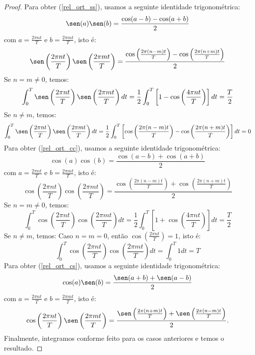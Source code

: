 \begin{proof}
 Para obter (\ref{rel_ort_ss}), usamos a seguinte identidade trigonométrica:
 \begin{equation}\sen(a)\sen(b)=\frac{\cos(a-b)-\cos(a+b)}{2}\end{equation}
com $a=\frac{2\pi nt}{T}$ e $b=\frac{2\pi mt}{T}$, isto é:
 \begin{equation}\sen\left(\frac{2\pi nt}{T}\right)\sen\left(\frac{2\pi mt}{T}\right)=\frac{\cos\left(\frac{2\pi (n-m)t}{T}\right)-\cos\left(\frac{2\pi (n+m)t}{T}\right)}{2}\end{equation}
Se $n=m\neq 0$, temos:
 \begin{equation}\int_0^T\sen\left(\frac{2\pi nt}{T}\right)\sen\left(\frac{2\pi mt}{T}\right)dt=\frac{1}{2}\int_0^T\left[1-\cos\left(\frac{4\pi nt}{T}\right)\right]dt=\frac{T}{2}\end{equation}
 Se $n\neq m$, temos:
 \begin{equation}
   \int_0^T\sen\left(\frac{2\pi nt}{T}\right)\sen\left(\frac{2\pi mt}{T}\right)dt = \frac{1}{2}\int_0^T\left[\cos\left(\frac{2\pi (n-m)t}{T}\right)-\cos\left(\frac{2\pi (n+m)t}{T}\right)\right]dt=0
\end{equation}
 Para obter (\ref{rel_ort_cc}), usamos a seguinte identidade trigonométrica:
 \begin{equation}\cos(a)\cos(b)=\frac{\cos(a-b)+\cos(a+b)}{2}\end{equation}
com $a=\frac{2\pi nt}{T}$ e $b=\frac{2\pi mt}{T}$, isto é:
 \begin{equation}\cos\left(\frac{2\pi nt}{T}\right)\cos\left(\frac{2\pi mt}{T}\right)=\frac{\cos\left(\frac{2\pi (n-m)t}{T}\right)+\cos\left(\frac{2\pi (n+m)t}{T}\right)}{2}\end{equation}
 Se $n=m\neq 0$, temos:
 \begin{equation}\int_0^T\cos\left(\frac{2\pi nt}{T}\right)\cos\left(\frac{2\pi mt}{T}\right)dt=\frac{1}{2}\int_0^T\left[1+\cos\left(\frac{4\pi nt}{T}\right)\right]dt=\frac{T}{2}\end{equation}
 Se $n\neq m$, temos:
Caso $n=m= 0$, então $\cos\left(\frac{2\pi nt}{T}\right)=1$, isto é:
\begin{equation}\int_0^T\cos\left(\frac{2\pi nt}{T}\right)\cos\left(\frac{2\pi mt}{T}\right)dt=\int_0^T 1dt=T\end{equation}
 Para obter (\ref{rel_ort_cs}), usamos a seguinte identidade trigonométrica:
\begin{equation}\cos(a)\sen(b)=\frac{\sen(a+b)+\sen(a-b)}{2}\end{equation}
com $a=\frac{2\pi nt}{T}$ e $b=\frac{2\pi mt}{T}$, isto é:
 \begin{equation}\cos\left(\frac{2\pi nt}{T}\right)\sen\left(\frac{2\pi mt}{T}\right)=\frac{\sen\left(\frac{2\pi (n+m)t}{T}\right)+\sen\left(\frac{2\pi (n-m)t}{T}\right)}{2}.
\end{equation}
Finalmente, integramos conforme feito para os casos anteriores e temos o resultado.
 \end{proof}
